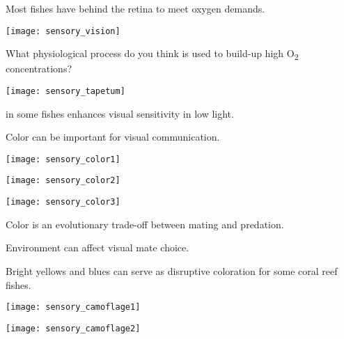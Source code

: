 \label{key}\documentclass[t]{beamer}
\begin{document}
\begin{frame}[t]{Most fishes have  behind the retina to meet oxygen demands.}

\vspace{-\baselineskip}

\begin{multicols}{2}
\texttt{[image: sensory\_vision]}

\columnbreak

What physiological process do you think is used to build-up high O\textsubscript{2} concentrations?

\vspace{2\baselineskip}

\texttt{[image: sensory\_tapetum]}

\vspace{0.2\baselineskip}

 in some fishes enhances visual sensitivity in low light.

\end{multicols}

\end{frame}

%

\begin{frame}[t]{Color can be important for visual communication.}

\vspace{-\baselineskip}

\begin{multicols}{2}

\texttt{[image: sensory\_color1]}

\texttt{[image: sensory\_color2]}

\texttt{[image: sensory\_color3]}
\columnbreak

Color is an evolutionary trade-off between mating and predation.

\vspace{9\baselineskip}

Environment can affect visual mate choice.

\end{multicols}

\end{frame}

\begin{frame}[t]{Bright yellows and blues can serve as disruptive coloration for some coral reef fishes.}

\vspace{-\baselineskip}

\begin{multicols}{2}

\texttt{[image: sensory\_camoflage1]}

\columnbreak

\texttt{[image: sensory\_camoflage2]}

\end{multicols}

\end{frame}
\end{document}
